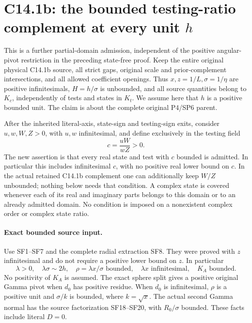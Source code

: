 \section{C14.1b: the bounded testing-ratio complement at every unit $h$}
\label{sec:c141b-bounded-testing-ratio}

This is a further partial-domain admission, independent of the positive
angular-pivot restriction in the preceding state-free proof. Keep the
entire original physical C14.1b source, all strict gaps, original scale
and prior-complement intersections, and all allowed coefficient openings.
Thus $x,z=1/L,\sigma=1/\eta$ are positive infinitesimals, $H=h/\sigma$
is unbounded, and all source quantities belong to $K_c$, independently
of tests and states in $K_t$. We assume here that $h$ is a positive
bounded unit. The claim is about the complete original P4/SP6 parent.

After the inherited literal-axis, state-sign and testing-sign exits,
consider $u,w,W,Z>0$, with $u,w$ infinitesimal, and define exclusively
in the testing field
\[
                 c=\frac{uW}{wZ}>0.
                 \tag{BC1}
\]
The new assertion is that every real state and test with $c$ bounded
is admitted. In particular this includes infinitesimal $c$, with no
positive real lower bound on $c$. In the actual retained C14.1b
complement one can additionally keep $W/Z$ unbounded; nothing below
needs that condition. A complex state is covered whenever each of its
real and imaginary parts belongs to this domain or to an already
admitted domain. No condition is imposed on a nonexistent complex
order or complex state ratio.

\paragraph{Exact bounded source input.}
Use SF1--SF7 and the complete radial extraction SF8. They were proved
with $z$ infinitesimal and do not require a positive lower bound on $z$.
In particular
\[
 \lambda>0,\quad \lambda\sigma\sim2h,\quad
 \rho=\lambda x/\sigma\text{ bounded},\quad
 \lambda x\text{ infinitesimal},\quad K_A\text{ bounded}.
 \tag{BC2}
\]
No positivity of $K_A$ is assumed. The exact sphere split gives
a positive original Gamma pivot when $d_0$ has positive residue.
When $d_0$ is infinitesimal, $\rho$ is a positive unit and
$\sigma/k$ is bounded, where $k=\sqrt x$. The actual second
Gamma normal has the source factorization SF18--SF20, with
$R_0/\sigma$ bounded. These facts include literal $D=0$.

